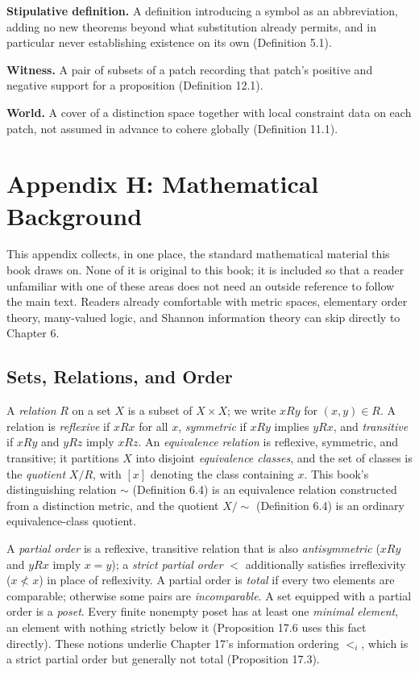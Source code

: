 \documentclass[11pt]{book}
\begin{document}
\textbf{Stipulative definition.} A definition introducing a symbol as an abbreviation, adding no new theorems beyond what substitution already permits, and in particular never establishing existence on its own (Definition 5.1).

\textbf{Witness.} A pair of subsets of a patch recording that patch's positive and negative support for a proposition (Definition 12.1).

\textbf{World.} A cover of a distinction space together with local constraint data on each patch, not assumed in advance to cohere globally (Definition 11.1).

\chapter*{Appendix H: Mathematical Background}

This appendix collects, in one place, the standard mathematical material this book draws on. None of it is original to this book; it is included so that a reader unfamiliar with one of these areas does not need an outside reference to follow the main text. Readers already comfortable with metric spaces, elementary order theory, many-valued logic, and Shannon information theory can skip directly to Chapter 6.

\section*{Sets, Relations, and Order}

A \emph{relation} $R$ on a set $X$ is a subset of $X \times X$; we write $xRy$ for $(x,y) \in R$. A relation is \emph{reflexive} if $xRx$ for all $x$, \emph{symmetric} if $xRy$ implies $yRx$, and \emph{transitive} if $xRy$ and $yRz$ imply $xRz$. An \emph{equivalence relation} is reflexive, symmetric, and transitive; it partitions $X$ into disjoint \emph{equivalence classes}, and the set of classes is the \emph{quotient} $X/R$, with $[x]$ denoting the class containing $x$. This book's distinguishing relation $\sim$ (Definition 6.4) is an equivalence relation constructed from a distinction metric, and the quotient $X/\!\sim$ (Definition 6.4) is an ordinary equivalence-class quotient.

A \emph{partial order} is a reflexive, transitive relation that is also \emph{antisymmetric} ($xRy$ and $yRx$ imply $x=y$); a \emph{strict partial order} $<$ additionally satisfies irreflexivity ($x \not< x$) in place of reflexivity. A partial order is \emph{total} if every two elements are comparable; otherwise some pairs are \emph{incomparable}. A set equipped with a partial order is a \emph{poset}. Every finite nonempty poset has at least one \emph{minimal element}, an element with nothing strictly below it (Proposition 17.6 uses this fact directly). These notions underlie Chapter 17's information ordering $<_i$, which is a strict partial order but generally not total (Proposition 17.3).
\end{document}
